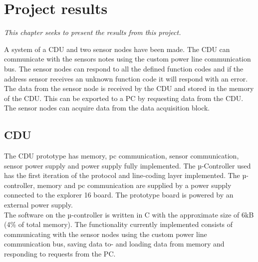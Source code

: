 \chapter{Project results}
\textit{This chapter seeks to present the results from this project.}

A system of a CDU and two sensor nodes have been made. The CDU can communicate with the sensors notes using the custom power line communication bus. The sensor nodes can respond to all the defined function codes and if the address sensor receives an unknown function code it will respond with an error.\\
The data from the sensor node is received by the CDU and stored in the memory of the CDU. This can be exported to a PC by requesting data from the CDU.\\
The sensor nodes can acquire data from the data acquisition block.
\section{CDU}
The CDU prototype has memory, pc communication, sensor communication, sensor power supply and power supply fully implemented. The µ-Controller used has the first iteration of the protocol and line-coding layer implemented. The µ-controller, memory and pc communication are supplied by a power supply connected to the explorer 16 board. The prototype board is powered by an external power supply.\\
The software on the µ-controller is written in C with the approximate size of 6kB (4\% of total memory). The functionality currently implemented consists of communicating with the sensor nodes using the custom power line communication bus, saving data to- and loading data from memory and responding to requests from the PC.

